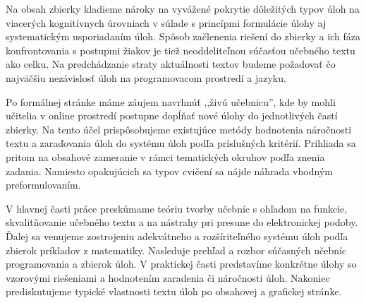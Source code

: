 Na obsah zbierky kladieme nároky na vyvážené pokrytie dôležitých typov úloh na viacerých kognitívnych úrovniach v súlade s princípmi formulácie úlohy aj systematickým usporiadaním úloh. Spôsob začlenenia riešení do zbierky a ich fáza konfrontovania s postupmi žiakov je tiež neoddeliteľnou súčasťou učebného textu ako celku. Na predchádzanie straty aktuálnosti textov budeme požadovať čo najväčšiu nezávislosť úloh na programovacom prostredí a jazyku.

Po formálnej stránke máme záujem navrhnúť ,,živú učebnicu'', kde by mohli učitelia v online prostredí postupne dopĺňať nové úlohy do jednotlivých častí zbierky. Na tento účel prispôsobujeme existujúce metódy hodnotenia náročnosti textu a zaraďovania úloh do systému úloh podľa príslušných kritérií. Prihliada sa pritom na obsahové zameranie v rámci tematických okruhov podľa znenia zadania. Namiesto opakujúcich sa typov cvičení sa nájde náhrada vhodným preformulovaním.

V hlavnej časti práce preskúmame teóriu tvorby učebníc s ohľadom na funkcie, skvalitňovanie učebného textu a na nástrahy pri presune do elektronickej podoby. Ďalej sa venujeme zostrojeniu adekvátneho a rozšíriteľného systému úloh podľa zbierok príkladov z matematiky. Nasleduje prehľad a rozbor súčasných učebníc programovania a zbierok úloh. V praktickej časti predstavíme konkrétne úlohy so vzorovými riešeniami a hodnotením zaradenia či náročnosti úloh. Nakoniec prediskutujeme typické vlastnosti textu úloh po obsahovej a grafickej stránke.